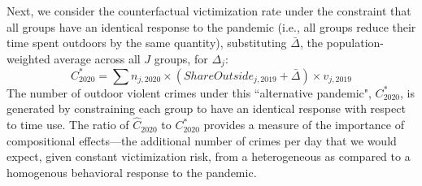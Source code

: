 Next, we consider the counterfactual victimization rate under the constraint that all groups have an identical response to the pandemic (i.e., all groups reduce their time spent outdoors by the same quantity), substituting $\bar{\Delta}$, the population-weighted average across all $J$ groups, for $\Delta_j$:
\begin{equation} \label{eq:selection3}
C^*_{2020} = \sum n_{j,2020} \times (ShareOutside_{j,2019} + \bar{\Delta}) \times v_{j,2019}
\end{equation}
The number of outdoor violent crimes under this ``alternative pandemic", $C^*_{2020}$, is generated by constraining each group to have an identical response with respect to time use. The ratio of $\hat{C}_{2020}$ to $C_{2020}^{*}$ provides a measure of the importance of compositional effects---the additional number of crimes per day that we would expect, given constant victimization risk, from a heterogeneous as compared to a homogenous behavioral response to the pandemic. 




